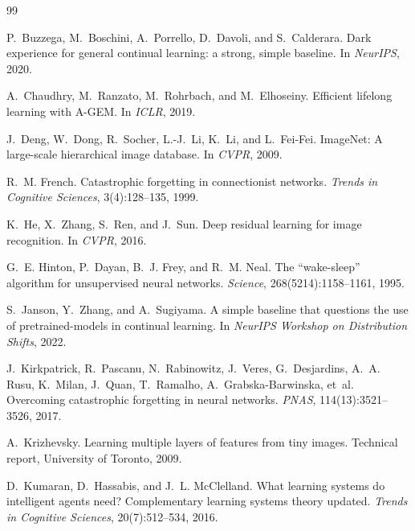\documentclass[10pt,twocolumn,letterpaper]{article}
\begin{document}
{\small

\begin{thebibliography}{99}

P.~Buzzega, M.~Boschini, A.~Porrello, D.~Davoli, and S.~Calderara.
\newblock Dark experience for general continual learning: a strong, simple baseline.
\newblock In \textit{NeurIPS}, 2020.

A.~Chaudhry, M.~Ranzato, M.~Rohrbach, and M.~Elhoseiny.
\newblock Efficient lifelong learning with {A-GEM}.
\newblock In \textit{ICLR}, 2019.

J.~Deng, W.~Dong, R.~Socher, L.-J.~Li, K.~Li, and L.~Fei-Fei.
\newblock Image{N}et: A large-scale hierarchical image database.
\newblock In \textit{CVPR}, 2009.

R.~M. French.
\newblock Catastrophic forgetting in connectionist networks.
\newblock \textit{Trends in Cognitive Sciences}, 3(4):128--135, 1999.

K.~He, X.~Zhang, S.~Ren, and J.~Sun.
\newblock Deep residual learning for image recognition.
\newblock In \textit{CVPR}, 2016.

G.~E. Hinton, P.~Dayan, B.~J. Frey, and R.~M. Neal.
\newblock The ``wake-sleep'' algorithm for unsupervised neural networks.
\newblock \textit{Science}, 268(5214):1158--1161, 1995.

S.~Janson, Y.~Zhang, and A.~Sugiyama.
\newblock A simple baseline that questions the use of pretrained-models in continual learning.
\newblock In \textit{NeurIPS Workshop on Distribution Shifts}, 2022.

J.~Kirkpatrick, R.~Pascanu, N.~Rabinowitz, J.~Veres, G.~Desjardins, A.~A. Rusu, K.~Milan, J.~Quan, T.~Ramalho, A.~Grabska-Barwinska, et~al.
\newblock Overcoming catastrophic forgetting in neural networks.
\newblock \textit{PNAS}, 114(13):3521--3526, 2017.

A.~Krizhevsky.
\newblock Learning multiple layers of features from tiny images.
\newblock Technical report, University of Toronto, 2009.

D.~Kumaran, D.~Hassabis, and J.~L. McClelland.
\newblock What learning systems do intelligent agents need? {C}omplementary learning systems theory updated.
\newblock \textit{Trends in Cognitive Sciences}, 20(7):512--534, 2016.


\end{thebibliography}}
\end{document}
